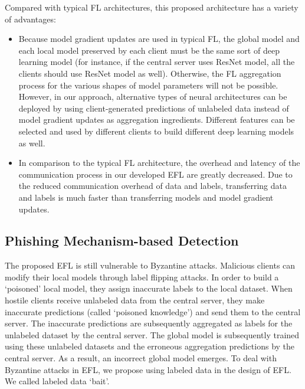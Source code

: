 \documentclass[journal]{IEEEtran}
\begin{document}
\par Compared with typical FL architectures, this proposed architecture has a variety of advantages:
\begin{itemize}

\item Because model gradient updates are used in typical FL, the global model and each local model preserved by each client must be the same sort of deep learning model (for instance, if the central server uses ResNet model, all the clients should use ResNet model as well). Otherwise, the FL aggregation process for the various shapes of model parameters will not be possible. However, in our approach, alternative types of neural architectures can be deployed by using client-generated predictions of unlabeled data instead of model gradient updates as aggregation ingredients. Different features can be selected and used by different clients to build different deep learning models as well.
\item In comparison to the typical FL architecture, the overhead and latency of the communication process in our developed EFL are greatly decreased. Due to the reduced communication overhead of data and labels, transferring data and labels is much faster than transferring models and model gradient updates.
\end{itemize}
    


\subsection{Phishing Mechanism-based Detection}
The proposed EFL is still vulnerable to Byzantine attacks. Malicious clients can modify their local models through label flipping attacks. In order to build a `poisoned' local model, they assign inaccurate labels to the local dataset. When hostile clients receive unlabeled data from the central server, they make inaccurate predictions (called `poisoned knowledge') and send them to the central server. The inaccurate predictions are subsequently aggregated as labels for the unlabeled dataset by the central server. The global model is subsequently trained using these unlabeled datasets and the erroneous aggregation predictions by the central server. As a result, an incorrect global model emerges. To deal with Byzantine attacks in EFL, we propose using labeled data in the design of EFL. We called labeled data `bait'.
\end{document}

